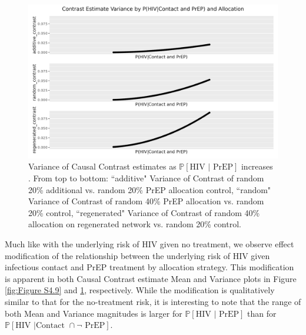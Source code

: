 \documentclass{article}
\theoremstyle{definition}
\begin{document}
\begin{figure}[H]
    \centering
    \includegraphics[width=\linewidth]{Corrected Figures/p2 Variance plots.png}
    \caption{Variance of Causal Contrast estimates as $\mathbb{P}\left[\text{HIV } \vert \text{ PrEP}\right]$ increases .  From top to bottom: ``additive" Variance of Contrast of random 20\% additional vs. random 20\% PrEP allocation control, ``random" Variance of Contrast of random 40\% PrEP allocation vs. random 20\% control, ``regenerated" Variance of Contrast of random 40\% allocation on regenerated network vs. random 20\% control.}
    \label{fig:Figure S4.10}
\end{figure}
Much like with the underlying risk of HIV given no treatment, we observe effect modification of the relationship between the underlying risk of HIV given infectious contact and PrEP treatment by allocation strategy. This modification is apparent in both Causal Contrast estimate Mean and Variance plots in Figure \ref{fig:Figure S4.9} and \ref{fig:Figure S4.10}, respectively. While the modification is qualitatively similar to that for the no-treatment risk, it is interesting to note that the range of both Mean and Variance magnitudes is larger for $\mathbb{P}\left[\text{HIV } \vert \text{ PrEP}\right]$ than for $\mathbb{P}\left[\text{HIV } \vert \text {Contact } \cap \neg \text{ PrEP}\right]$.
\end{document}
